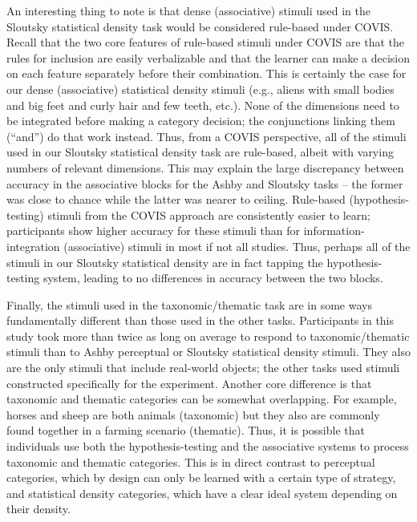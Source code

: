 \documentclass[../dissertation.tex]{subfiles}
\begin{document}
	An interesting thing to note is that dense (associative) stimuli used in the Sloutsky statistical density task would be considered rule-based under COVIS. Recall that the two core features of rule-based stimuli under COVIS are that the rules for inclusion are easily verbalizable and that the learner can make a decision on each feature separately before their combination. This is certainly the case for our dense (associative) statistical density stimuli (e.g., aliens with small bodies and big feet and curly hair and few teeth, etc.). None of the dimensions need to be integrated before making a category decision; the conjunctions linking them (“and”) do that work instead. Thus, from a COVIS perspective, all of the stimuli used in our Sloutsky statistical density task are rule-based, albeit with varying numbers of relevant dimensions. This may explain the large discrepancy between accuracy in the associative blocks for the Ashby and Sloutsky tasks – the former was close to chance while the latter was nearer to ceiling. Rule-based (hypothesis-testing) stimuli from the COVIS approach are consistently easier to learn; participants show higher accuracy for these stimuli than for information-integration (associative) stimuli in most if not all studies. Thus, perhaps all of the stimuli in our Sloutsky statistical density are in fact tapping the hypothesis-testing system, leading to no differences in accuracy between the two blocks. \par
	Finally, the stimuli used in the taxonomic/thematic task are in some ways fundamentally different than those used in the other tasks. Participants in this study took more than twice as long on average to respond to taxonomic/thematic stimuli than to Ashby perceptual or Sloutsky statistical density stimuli. They also are the only stimuli that include real-world objects; the other tasks used stimuli constructed specifically for the experiment. Another core difference is that taxonomic and thematic categories can be somewhat overlapping. For example, horses and sheep are both animals (taxonomic) but they also are commonly found together in a farming scenario (thematic). Thus, it is possible that individuals use both the hypothesis-testing and the associative systems to process taxonomic and thematic categories. This is in direct contrast to perceptual categories, which by design can only be learned with a certain type of strategy, and statistical density categories, which have a clear ideal system depending on their density. \par
\end{document}
